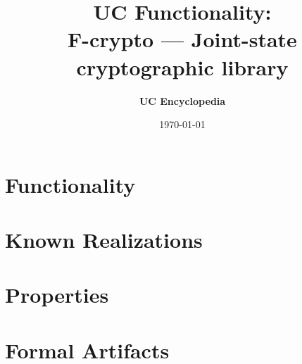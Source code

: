 \documentclass[11pt,a4paper]{article}
\title{\textbf{\Large UC Functionality:}\\[0.2em] \Large F-crypto --- Joint-state cryptographic library}
\author{\textbf{UC Encyclopedia}}
\date{\today}
\newtheorem{functionality}{Functionality}
\begin{document}
\maketitle

\begin{abstract}
\end{abstract}

\section{Functionality}

%

\section{Known Realizations}


\section{Properties}


\section{Formal Artifacts}

\end{document}
